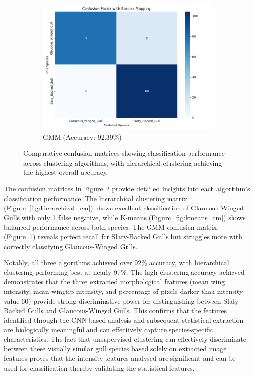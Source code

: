 \documentclass[a4paper,12pt]{report}
\begin{document}
\begin{figure}[H]
    \hfill
    \begin{subfigure}[b]{0.32\textwidth}
        \centering
        \includegraphics[width=\textwidth]{images/clustering/gmm_confusion_matrix.png}
        \caption{GMM (Accuracy: 92.39\%)}
        \label{fig:gmm_cm}
    \end{subfigure}
    \caption{Comparative confusion matrices showing classification performance across clustering algorithms, with hierarchical clustering achieving the highest overall accuracy.}
    \label{fig:confusion_matrices}
\end{figure}

The confusion matrices in Figure~\ref{fig:confusion_matrices} provide detailed insights into each algorithm's classification performance. The hierarchical clustering matrix (Figure~\ref{fig:hierarchical_cm}) shows excellent classification of Glaucous-Winged Gulls with only 1 false negative, while K-means (Figure~\ref{fig:kmeans_cm}) shows balanced performance across both species. The GMM confusion matrix (Figure~\ref{fig:gmm_cm}) reveals perfect recall for Slaty-Backed Gulls but struggles more with correctly classifying Glaucous-Winged Gulls.

Notably, all three algorithms achieved over 92\% accuracy, with hierarchical clustering performing best at nearly 97\%. The high clustering accuracy achieved demonstrates that the three extracted morphological features (mean wing intensity, mean wingtip intensity, and percentage of pixels darker than intensity value 60) provide strong discriminative power for distinguishing between Slaty-Backed Gulls and Glaucous-Winged Gulls. This confirms that the features identified through the CNN-based analysis and subsequent statistical extraction are biologically meaningful and can effectively capture species-specific characteristics. The fact that unsupervised clustering can effectively discriminate between these visually similar gull species based solely on extracted image features proves that the intensity features analysed are significant and can be used for classification thereby validating the statistical features.
\end{document}
